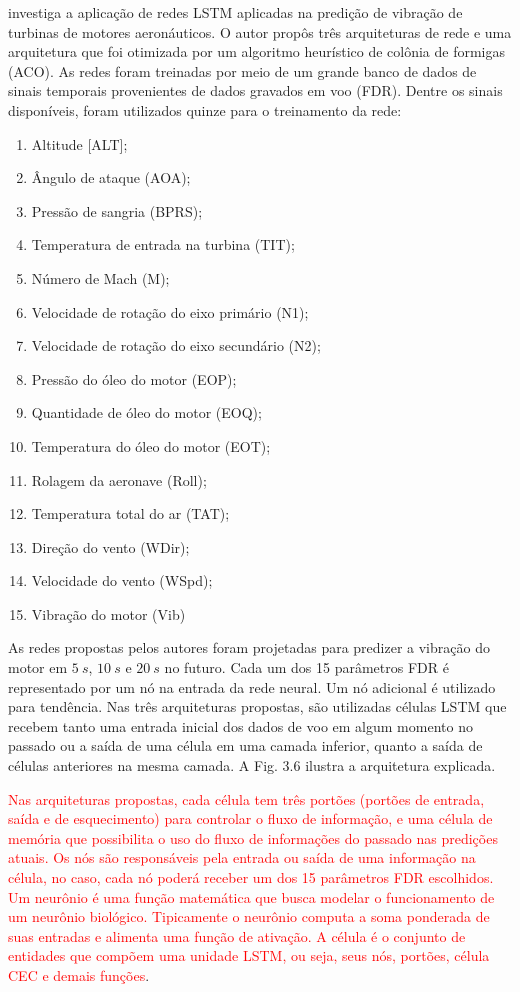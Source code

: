  investiga a aplicação de redes LSTM aplicadas na predição de vibração de turbinas de motores aeronáuticos. O autor propôs três arquiteturas de rede e uma arquitetura que foi otimizada por um algoritmo heurístico de colônia de formigas (ACO). As redes foram treinadas por meio de um grande banco de dados de sinais temporais provenientes de dados gravados em voo (FDR). Dentre os sinais disponíveis, foram utilizados quinze para o treinamento da rede:
\begin{enumerate}
	\setlength{\itemsep}{0pt}
	\setlength{\parskip}{0pt}
	\item Altitude [ALT];
	\item Ângulo de ataque (AOA);
	\item Pressão de sangria (BPRS);
	\item Temperatura de entrada na turbina (TIT);
	\item Número de Mach (M);
	\item Velocidade de rotação do eixo primário (N1);
	\item Velocidade de rotação do eixo secundário (N2);
	\item Pressão do óleo do motor (EOP);
	\item Quantidade de óleo do motor (EOQ);
	\item Temperatura do óleo do motor (EOT);
	\item Rolagem da aeronave (Roll);
	\item Temperatura total do ar (TAT);
	\item Direção do vento (WDir);
	\item Velocidade do vento (WSpd);
	\item Vibração do motor (Vib)
\end{enumerate}

As redes propostas pelos autores foram projetadas para predizer a vibração do motor em $5 \ s$, $10 \ s$ e $20 \ s$ no futuro. Cada um dos 15 parâmetros FDR é representado por um nó na entrada da rede neural. Um nó adicional é utilizado para tendência. Nas três arquiteturas propostas, são utilizadas células LSTM que recebem tanto uma entrada inicial dos dados de voo em algum momento no passado ou a saída de uma célula em uma camada inferior, quanto a saída de células anteriores na mesma camada. A Fig. 3.6 ilustra a arquitetura explicada.

\textcolor{red}{Nas arquiteturas propostas, cada célula tem três portões (portões de entrada, saída e de esquecimento) para controlar o fluxo de informação, e uma célula de memória que possibilita o uso do fluxo de informações do passado nas predições atuais. Os nós são responsáveis pela entrada ou saída de uma informação na célula, no caso, cada nó poderá receber um dos 15 parâmetros FDR escolhidos. Um neurônio é uma função matemática que busca modelar o funcionamento de um neurônio biológico. Tipicamente o neurônio computa a soma ponderada de suas entradas e alimenta uma função de ativação. A célula é o conjunto de entidades que compõem uma unidade LSTM, ou seja, seus nós, portões, célula CEC e demais funções}.

